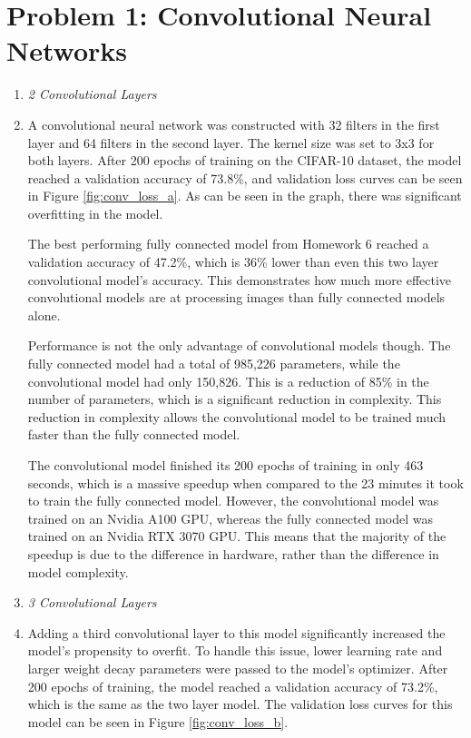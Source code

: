 \documentclass{article}
\begin{document}


\section{Problem 1: Convolutional Neural Networks}
\begin{enumerate}[label=\alph*. ]
    \item \textit{2 Convolutional Layers}
    \item 
     A convolutional neural network was constructed with 32 filters in the first layer and 64 filters in the second layer. The kernel size was set to 3x3 for both layers. After 200 epochs of training on the CIFAR-10 dataset, the model reached a validation accuracy of 73.8\%, and validation loss curves can be seen in Figure \ref{fig:conv_loss_a}. As can be seen in the graph, there was significant overfitting in the model.
     
     The best performing fully connected model from Homework 6 reached a validation accuracy of 47.2\%, which is 36\% lower than even this two layer convolutional model's accuracy. This demonstrates how much more effective convolutional models are at processing images than fully connected models alone. 
     
     Performance is not the only advantage of convolutional models though. The fully connected model had a total of 985,226 parameters, while the convolutional model had only 150,826. This is a reduction of 85\% in the number of parameters, which is a significant reduction in complexity. This reduction in complexity allows the convolutional model to be trained much faster than the fully connected model. 
     
     The convolutional model finished its 200 epochs of training in only 463 seconds, which is a massive speedup when compared to the 23 minutes it took to train the fully connected model. However, the convolutional model was trained on an Nvidia A100 GPU, whereas the fully connected model was trained on an Nvidia RTX 3070 GPU. This means that the majority of the speedup is due to the difference in hardware, rather than the difference in model complexity.
     
     \item \textit{3 Convolutional Layers}
     \item 
     Adding a third convolutional layer to this model significantly increased the model's propensity to overfit. To handle this issue, lower learning rate and larger weight decay parameters were passed to the model's optimizer. After 200 epochs of training, the model reached a validation accuracy of 73.2\%, which is the same as the two layer model. The validation loss curves for this model can be seen in Figure \ref{fig:conv_loss_b}.


\end{enumerate}
\end{document}

